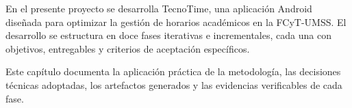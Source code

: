 
\noindent En el presente proyecto se desarrolla TecnoTime, una aplicación Android diseñada para optimizar la gestión de horarios académicos en la FCyT-UMSS. El desarrollo se estructura en doce fases iterativas e incrementales, cada una con objetivos, entregables y criterios de aceptación específicos.

Este capítulo documenta la aplicación práctica de la metodología, las decisiones técnicas adoptadas, los artefactos generados y las evidencias verificables de cada fase.
